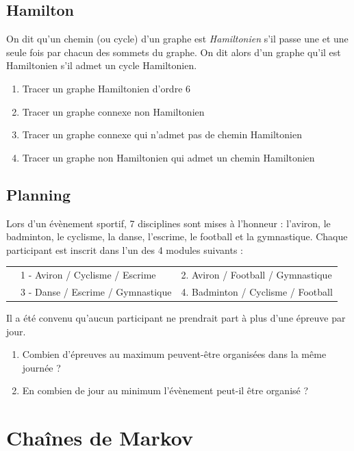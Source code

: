 \documentclass[oneside,12pt]{article}          %
\begin{document}
\subsection{Hamilton}
On dit qu'un chemin (ou cycle) d'un graphe est \textit{Hamiltonien} s'il passe une et une seule fois par chacun des sommets du graphe. On dit alors d'un graphe qu'il est Hamiltonien s'il admet un cycle Hamiltonien.
\begin{enumerate}
    \item Tracer un graphe Hamiltonien d'ordre 6
    \item Tracer un graphe connexe non Hamiltonien
    \item Tracer un graphe connexe qui n'admet pas de chemin Hamiltonien
    \item Tracer un graphe non Hamiltonien qui admet un chemin Hamiltonien
\end{enumerate}



\subsection{Planning}
Lors d'un évènement sportif, 7 disciplines sont mises à l'honneur : l'aviron, le badminton, le cyclisme, la danse, l'escrime, le football et la gymnastique. Chaque participant est inscrit dans l'un des 4 modules suivants :

\begin{tabular}{p{}p{} p{}}
     & 1 - Aviron / Cyclisme / Escrime & 
     2. Aviron / Football / Gymnastique \\
     & 3 - Danse / Escrime / Gymnastique &
     4. Badminton / Cyclisme / Football
\end{tabular}

Il a été convenu qu'aucun participant ne prendrait part à plus d'une épreuve par jour.
\begin{enumerate}
    \item Combien d'épreuves au maximum peuvent-être organisées dans la même journée ?
    \item En combien de jour au minimum l'évènement peut-il être organisé ?
\end{enumerate}




\section{Chaînes de Markov}
\end{document}
